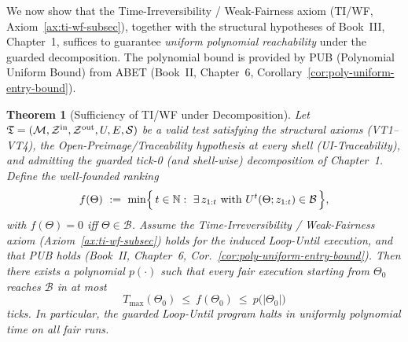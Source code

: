 \documentclass[12pt]{article}
\theoremstyle{definition}
\theoremstyle{plain}
\newtheorem{theorem}{Theorem}[section]
\begin{document}
We now show that the Time-Irreversibility / Weak-Fairness axiom (TI/WF, Axiom~\ref{ax:ti-wf-subsec}), together with the structural hypotheses of Book~III, Chapter~1, suffices to guarantee \emph{uniform polynomial reachability} under the guarded decomposition. The polynomial bound is provided by PUB (Polynomial Uniform Bound) from ABET (Book~II, Chapter~6, Corollary~\ref{cor:poly-uniform-entry-bound}).

\begin{theorem}[Sufficiency of TI/WF under Decomposition]
\label{thm:sufficiency-TIWF-PUB}
Let $\mathfrak T=(\mathcal M,\mathcal Z^{\rm in},\mathcal Z^{\rm out},U,E,\mathcal S)$ be a valid test satisfying the structural axioms (VT1–VT4), the Open-Preimage/Traceability hypothesis at every shell (UI-Traceability), and admitting the guarded tick-0 (and shell-wise) decomposition of Chapter~1. Define the well-founded ranking
\[
f(\Theta)\ :=\ \min\Bigl\{\,t\in\mathbb N:\ \exists\,z_{1:t}\ \text{with}\ U^t(\Theta;z_{1:t})\in\mathcal B\,\Bigr\},
\]
with $f(\Theta)=0$ iff $\Theta\in\mathcal B$.
Assume the Time-Irreversibility / Weak-Fairness axiom (Axiom~\ref{ax:ti-wf-subsec}) holds for the induced Loop-Until execution, and that PUB holds (Book~II, Chapter~6, Cor.~\ref{cor:poly-uniform-entry-bound}). Then there exists a polynomial $p(\cdot)$ such that every fair execution starting from $\Theta_0$ reaches $\mathcal B$ in at most
\[
T_{\max}(\Theta_0)\ \le\ f(\Theta_0)\ \le\ p\bigl(|\Theta_0|\bigr)
\]
ticks. In particular, the guarded Loop-Until program halts in uniformly polynomial time on all fair runs.
\end{theorem}
\end{document}
